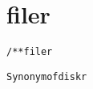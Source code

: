 \section{filer}
\begin{shaded}
\begin{alltt}
/** filer

  Synonym of diskr

\end{alltt}
\end{shaded}
